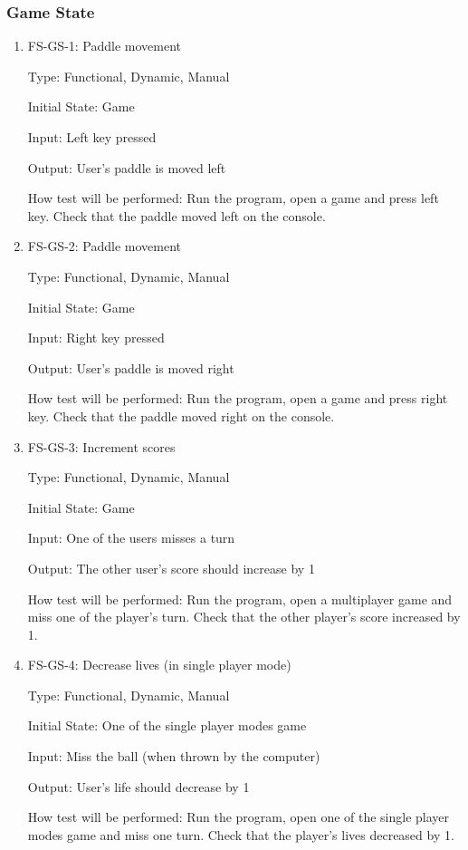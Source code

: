 \documentclass[12pt,letterpaper]{article}
\begin{document}
	\subsubsection{Game State}
	\begin{enumerate}
	\item FS-GS-1: Paddle movement

	Type: Functional, Dynamic, Manual

	Initial State: Game 

	Input: Left key pressed

	Output: User’s paddle is moved left

	How test will be performed: Run the program, open a game and press left key. Check that the paddle moved left on the console.

	\item FS-GS-2: Paddle movement

	Type: Functional, Dynamic, Manual

	Initial State: Game 

	Input: Right key pressed

	Output: User’s paddle is moved right

	How test will be performed: Run the program, open a game and press right key. Check that the paddle moved right on the console.

	\item FS-GS-3: Increment scores

	Type: Functional, Dynamic, Manual

	Initial State: Game 

	Input: One of the users misses a turn

	Output: The other user’s score should increase by 1

	How test will be performed: Run the program, open a multiplayer game and miss one of the player’s turn. Check that the other player’s score increased by 1.

	\item FS-GS-4: Decrease lives (in single player mode)

	Type: Functional, Dynamic, Manual

	Initial State: One of the single player modes game 

	Input: Miss the ball (when thrown by the computer)

	Output: User’s life should decrease by 1

	How test will be performed: Run the program, open one of the single player modes game and miss one turn. Check that the player’s lives decreased by 1.
	\end{enumerate}
\end{document}
